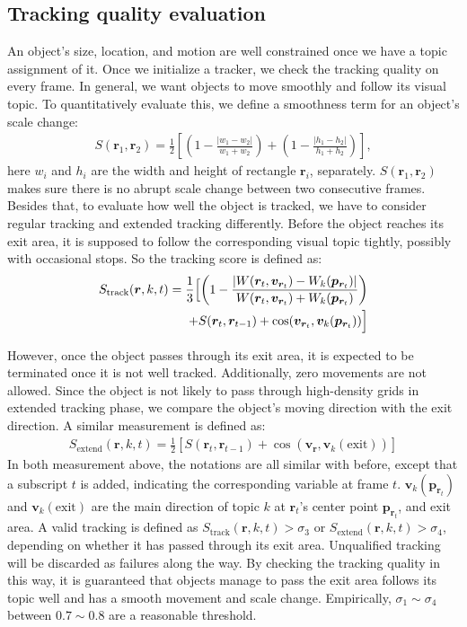 \subsection{Tracking quality evaluation}
\label{sec:track_eval}
An object's size, location, and motion are well constrained once we have a topic assignment of it. 
Once we initialize a tracker, we check the tracking quality on every frame. In general, we want objects to move smoothly and follow its visual topic. To quantitatively evaluate this, we define a smoothness term for an object's scale change:
\begin{align}
    S(\bm{r}_1, \bm{r}_2) = \frac{1}{2}\left[\left(1-\frac{|w_1- w_2|}{w_1 + w_2}\right) + \left(1-\frac{|h_1 - h_2|}{h_1 + h_2}\right)\right], 
\end{align}
here $w_i$ and $h_i$ are the width and height of rectangle $\bm{r}_{i}$, separately. $S(\bm{r}_1, \bm{r}_2)$ makes sure there is no abrupt scale change between two consecutive frames.
Besides that, to evaluate how well the object is tracked, we have to consider regular tracking and extended tracking differently. 
Before the object reaches its exit area, it is supposed to follow the corresponding visual topic tightly, possibly with occasional stops. So the tracking score is defined as:
\begin{align}
\begin{split}
    S_{\text{track}}(\bm{r}, k, t) = \frac{1}{3}\Bigl[\left(1 - \frac{|W(\bm{r}_t, \bm{v}_{\bm{r}_t}) - W_k(\bm{p}_{\bm{r}_t})|}{W(\bm{r}_t, \bm{v}_{\bm{r}_t}) + W_k(\bm{p}_{\bm{r}_t})}\right) \\
    + S(\bm{r}_t, \bm{r}_{t-1}) + \cos(\bm{v}_{\bm{r}_t}, \bm{v}_k(\bm{p}_{\bm{r}_t}))\Bigl]
\end{split}
\label{eq:track_score}
\end{align}

However, once the object passes through its exit area, it is expected to be terminated once it is not well tracked. 
Additionally, zero movements are not allowed. Since the object is not likely to pass through high-density grids in extended tracking phase, we compare the object's moving direction with the exit direction. A similar measurement is defined as:
\begin{align}
    S_{\text{extend}}(\bm{r}, k, t) = \frac{1}{2}\left[S(\bm{r}_t, \bm{r}_{t-1}) + \cos(\bm{v_r}, \bm{v}_k(\text{exit}))\right]\label{eq:track_ext_score}
\end{align}
In both measurement above, the notations are all similar with before, except that a subscript $t$ is added, indicating the corresponding variable at frame $t$. 
$\bm{v}_k(\bm{p}_{\bm{r}_t})$ and $\bm{v}_k(\text{exit})$ are the main direction of topic $k$ at $\bm{r}_{t}$'s center point $\bm{p}_{\bm{r}_t}$, and exit area.
A valid tracking is defined as $S_{\text{track}}(\bm{r}, k, t)>\sigma_{3}$ or $S_{\text{extend}}(\bm{r}, k, t)>\sigma_{4}$, depending on whether it has passed through its exit area. Unqualified tracking will be discarded as failures along the way.
By checking the tracking quality in this way, it is guaranteed that objects manage to pass the exit area follows its topic well and has a smooth movement and scale change. 
Empirically, $\sigma_1\sim\sigma_{4}$ between $0.7\sim0.8$ are a reasonable threshold.
